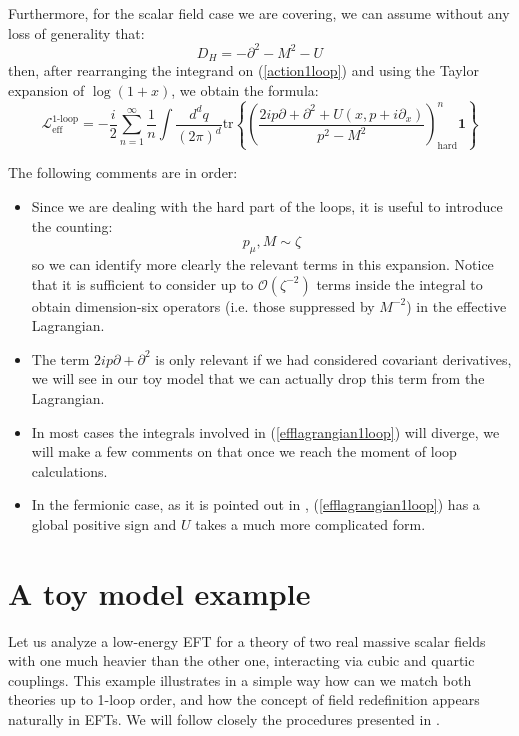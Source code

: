 \documentclass[11pt]{article}
\begin{document}
Furthermore, for the scalar field case we are covering, we can assume without any loss of generality that:
\begin{equation}
    D_H=-\partial^2-M^2-U
\end{equation}
then, after rearranging the integrand on (\ref{action1loop}) and using the Taylor expansion of $\log(1+x)$, we obtain the formula:
\begin{equation}\label{efflagrangian1loop}
     \mathcal{L}^{\text{1-loop}}_{\text{eff}}=-\dfrac{i}{2}\sum_{n=1}^{\infty}\dfrac{1}{n}\int \dfrac{d^dq}{(2\pi)^d}\text{tr}\left\{\left(\dfrac{2ip\partial+\partial^2+U(x,p+i\partial_x)}{p^2-M^2}\right)_{\text{hard}}^n\mathbf{1}\right\}
\end{equation}

The following comments are in order:
\begin{itemize}
    \item  Since we are dealing with the hard part of the loops, it is useful to introduce the counting:
    \begin{equation*}
        p_\mu,M\sim \zeta
    \end{equation*}
   so we can identify more clearly the relevant terms in this expansion. Notice that it is sufficient to consider up to $\mathcal{O}(\zeta^{-2})$ terms inside the integral to obtain dimension-six operators (i.e. those suppressed by $M^{-2}$) in the effective Lagrangian.
    \item The term $2ip\partial+\partial^2$ is only relevant if we had considered covariant derivatives, we will see in our toy model that we can actually drop this term from the Lagrangian.
    \item In most cases the integrals involved in (\ref{efflagrangian1loop}) will diverge, we will make a few comments on that once we reach the moment of loop calculations.
    \item In the fermionic case, as it is pointed out in \cite{Fuentes_Mart_n_2016}, (\ref{efflagrangian1loop}) has a global positive sign and $U$ takes a much more complicated form.
\end{itemize}
\section{A toy model example} 
Let us analyze a low-energy EFT for a theory of two real massive scalar fields with one much heavier than the other one, interacting via cubic and quartic couplings. This example illustrates in a simple way how can we match both theories up to 1-loop order, and how the concept of field redefinition appears naturally in EFTs. We will follow closely the procedures presented in \cite{Falkowski,Fuentes_Mart_n_2016}.
\end{document}
